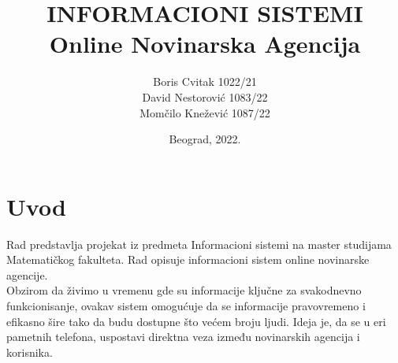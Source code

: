 \documentclass{article}
\title{INFORMACIONI SISTEMI\\Online Novinarska Agencija}
\author{
Boris Cvitak 1022/21\\
David Nestorović 1083/22\\
Momčilo Knežević 1087/22
}
\date{Beograd, 2022.}
\begin{document}
\maketitle

\newpage

\tableofcontents

\newpage

\section{Uvod}
\indent Rad predstavlja projekat iz predmeta Informacioni sistemi na master studijama Matematičkog 
fakulteta. Rad opisuje informacioni sistem online novinarske agencije. \\
\indent Obzirom da živimo u vremenu gde su informacije ključne za svakodnevno funkcionisanje, ovakav sistem omogućuje da se informacije pravovremeno i efikasno šire tako da budu dostupne što većem broju ljudi.  Ideja je, da se u eri pametnih telefona, uspostavi direktna veza između novinarskih agencija i korisnika.
\end{document}
